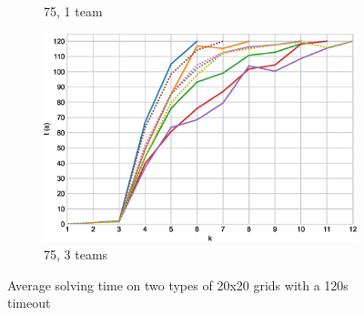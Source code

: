 \documentclass[english,10pt]{article}
\begin{document}
\begin{figure}[t]
\begin{subfigure}{0.44\textwidth}
			\caption{75, 1 team}
			\label{fig:75-1-p}
		\end{subfigure}
		\begin{subfigure}{0.44\textwidth}
			\centering
			\includegraphics[width=\linewidth]{img/results/relative-comparison/75-3}
			\caption{75, 3 teams}
			\label{fig:75-3-p}
		\end{subfigure}
		\caption{Average solving time on two types of 20x20 grids with a 120s timeout}
		\label{fig:probs}
	\end{figure}
	
	\restoregeometry
\end{document}
